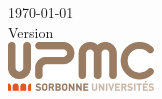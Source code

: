 \begin{titlepage}
\vfill



{\large \today}\\[3mm] %
{\large Version \docversion}\\[1.5cm] 


\includegraphics[height=13mm]{../images/logo.png} %



\end{titlepage}